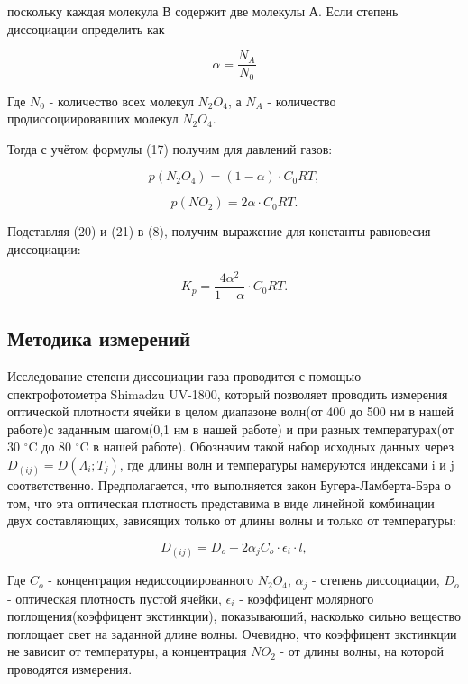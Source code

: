 \documentclass[a4paper,12pt]{article} %
\begin{document}
поскольку каждая молекула В содержит две молекулы А.
Если степень диссоциации определить как

\begin{equation}
 \alpha = \frac{N_A}{N_0}	
\end{equation}

Где $N_0$ - количество всех молекул $N_2 O_4$, а $N_A$ - количество продиссоциировавших молекул $N_2 O_4$.

Тогда с учётом формулы (17) получим для давлений газов:

\begin{equation}
 p(N_2 O_4)  = (1 - \alpha) \cdot C_0 RT,
\end{equation}


\begin{equation}
p(N O_2)  = 2\alpha \cdot C_0 RT.
\end{equation}


Подставляя (20) и (21) в (8), получим выражение для константы равновесия диссоциации:

\begin{equation}
K_p = \frac{4 \alpha^2}{1- \alpha}\cdot C_0 RT.
\end{equation}



\subsection*{Методика измерений}

Исследование степени диссоциации газа проводится с помощью спектрофотометра Shimadzu UV-1800, который позволяет проводить измерения оптической плотности ячейки в целом диапазоне волн(от 400 до 500 нм в нашей работе)с заданным шагом(0,1 нм в нашей работе) и при разных температурах(от 30 $^\circ$C до 80 $^\circ$C в нашей работе). Обозначим такой набор исходных данных через $D_(ij) = D(\Lambda_i;T_j)$, где длины волн и температуры намеруются индексами i и j соответственно. Предполагается, что выполняется закон Бугера-Ламберта-Бэра о том, что эта оптическая плотность представима в виде  линейной комбинации двух составляющих, зависящих только от длины волны и только от температуры:

\begin{equation}
 D_(ij) =D_o + 2\alpha_jC_o \cdot \epsilon_i \cdot l,
\end{equation}

Где $C_o$ - концентрация недиссоциированного $N_2 O_4$, $\alpha_j$ - степень диссоциации, $D_o$ - оптическая плотность пустой ячейки, $\epsilon_i$ -  коэффицент молярного поглощения(коэффицент экстинкции), показывающий, насколько сильно вещество поглощает свет на заданной длине волны. Очевидно, что коэффицент экстинкции не зависит от температуры, а концентрация $NO_2$ - от длины волны, на которой проводятся измерения. 
\end{document}

